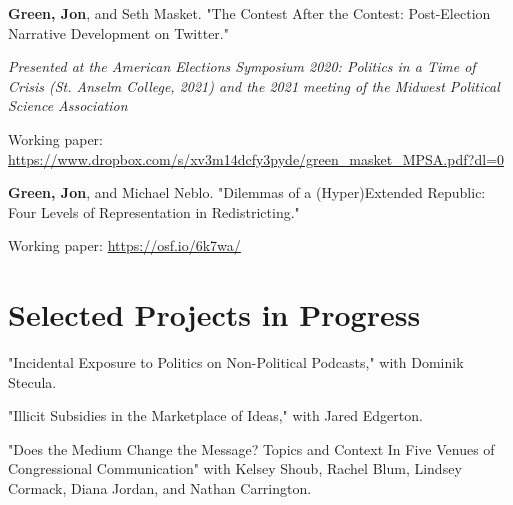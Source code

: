 \documentclass[letterpaper]{article}
\renewenvironment{itemize}{
  \begin{list}{}{
    \setlength{\leftmargin}{1.5em}
  }
}{
  \end{list}
}
\begin{document}
\begin{itemize}
\item \textbf{Green, Jon}, and Seth Masket. "The Contest After the Contest: Post-Election Narrative Development on Twitter." 
\begin{itemize}
\item \textit{Presented at the American Elections Symposium 2020: Politics in a Time of Crisis (St. Anselm College, 2021) and the 2021 meeting of the Midwest Political Science Association}
\item Working paper: \url{https://www.dropbox.com/s/xv3m14dcfy3pyde/green_masket_MPSA.pdf?dl=0}
\end{itemize}

\item \textbf{Green, Jon}, and Michael Neblo. "Dilemmas of a (Hyper)Extended Republic: Four Levels of Representation in Redistricting." 
\begin{itemize}
\item Working paper: \url{https://osf.io/6k7wa/}
\end{itemize}

\end{itemize}

\section*{Selected Projects in Progress}

\begin{itemize}

\item "Incidental Exposure to Politics on Non-Political Podcasts," with Dominik Stecula.

\item "Illicit Subsidies in the Marketplace of Ideas," with Jared Edgerton.


\item "Does the Medium Change the Message? Topics and Context In Five Venues of Congressional Communication" with Kelsey Shoub, Rachel Blum, Lindsey Cormack, Diana Jordan, and Nathan Carrington.


\end{itemize}
\end{document}
